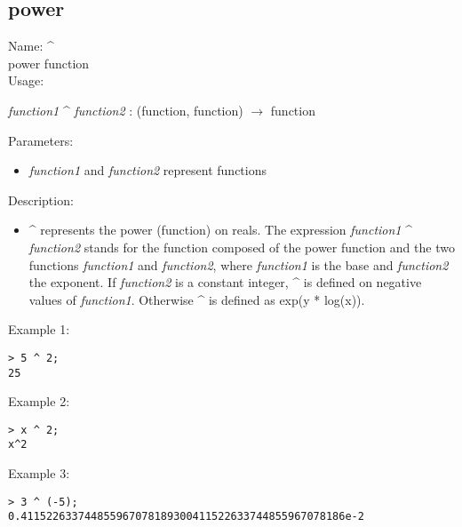 \subsection{ power }
\noindent Name: \textbf{\^}\\
power function\\

\noindent Usage: 
\begin{center}
\emph{function1} \textbf{\^} \emph{function2} : (\textsf{function}, \textsf{function}) $\rightarrow$ \textsf{function}\\
\end{center}
Parameters: 
\begin{itemize}
\item \emph{function1} and \emph{function2} represent functions
\end{itemize}
\noindent Description: \begin{itemize}

\item \textbf{\^} represents the power (function) on reals. 
   The expression \emph{function1} \textbf{\^} \emph{function2} stands for
   the function composed of the power function and the two
   functions \emph{function1} and \emph{function2}, where \emph{function1} is
   the base and \emph{function2} the exponent.
   If \emph{function2} is a constant integer, \textbf{\^} is defined
   on negative values of \emph{function1}. Otherwise \textbf{\^}
   is defined as exp(y * log(x)).
\end{itemize}
\noindent Example 1: 
\begin{center}\begin{minipage}{15cm}\begin{Verbatim}[frame=single]
> 5 ^ 2;
25
\end{Verbatim}
\end{minipage}\end{center}
\noindent Example 2: 
\begin{center}\begin{minipage}{15cm}\begin{Verbatim}[frame=single]
> x ^ 2;
x^2
\end{Verbatim}
\end{minipage}\end{center}
\noindent Example 3: 
\begin{center}\begin{minipage}{15cm}\begin{Verbatim}[frame=single]
> 3 ^ (-5);
0.411522633744855967078189300411522633744855967078186e-2
\end{Verbatim}
\end{minipage}\end{center}
